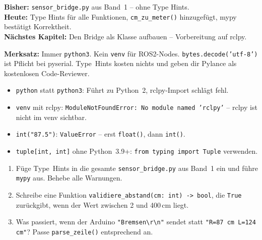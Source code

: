 \begin{projektBox}
\textbf{Bisher:} \texttt{sensor\_bridge.py} aus Band~1 -- ohne Type Hints.\\
\textbf{Heute:} Type Hints für alle Funktionen, \texttt{cm\_zu\_meter()} hinzugefügt,
mypy bestätigt Korrektheit.\\
\textbf{Nächstes Kapitel:} Den Bridge als Klasse aufbauen -- Vorbereitung auf rclpy.
\end{projektBox}

\begin{merksatzBox}
\textbf{Merksatz:} Immer \texttt{python3}. Kein \texttt{venv} für ROS2-Nodes.
\texttt{bytes.decode('utf-8')} ist Pflicht bei pyserial.
Type~Hints kosten nichts und geben dir Pylance als kostenlosen Code-Reviewer.
\end{merksatzBox}

\begin{fehlerBox}
\begin{itemize}
\item \texttt{python} statt \texttt{python3}: Führt zu Python~2, rclpy-Import schlägt fehl.
\item \texttt{venv} mit rclpy: \texttt{ModuleNotFoundError: No module named 'rclpy'} --
  rclpy ist nicht im venv sichtbar.
\item \texttt{int("87.5")}: \texttt{ValueError} -- erst \texttt{float()}, dann \texttt{int()}.
\item \texttt{tuple[int, int]} ohne Python~3.9+: \texttt{from typing import Tuple} verwenden.
\end{itemize}
\end{fehlerBox}

\begin{uebungBox}
\begin{enumerate}
\item Füge Type~Hints in die gesamte \texttt{sensor\_bridge.py} aus Band~1 ein
  und führe \texttt{mypy} aus. Behebe alle Warnungen.
\item Schreibe eine Funktion \texttt{validiere\_abstand(cm: int) -> bool},
  die \texttt{True} zurückgibt, wenn der Wert zwischen 2 und 400\,cm liegt.
\item Was passiert, wenn der Arduino \texttt{"Bremsen\textbackslash r\textbackslash n"} sendet
  statt \texttt{"R=87 cm  L=124 cm"}? Passe \texttt{parse\_zeile()} entsprechend an.
\end{enumerate}
\end{uebungBox}

